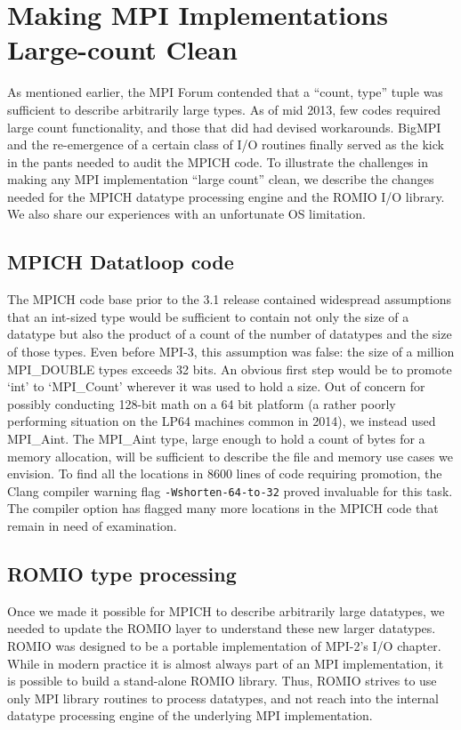 
\section{Making MPI Implementations Large-count Clean}
As mentioned earlier, the MPI Forum contended that a ``count, type''
tuple was sufficient to describe arbitrarily large types.  As of mid 2013, few codes
required large count functionality, and those that did had devised workarounds.
BigMPI and the re-emergence of a certain class of I/O routines finally served
as the kick in
the pants needed to audit the MPICH code.  To illustrate the challenges in
making any MPI implementation ``large count'' clean, we describe the changes
needed for the MPICH datatype processing engine and the ROMIO I/O library. We
also share our experiences with an unfortunate OS limitation.


\subsection{MPICH Datatloop code}
The MPICH code base prior to the
3.1 release contained widespread assumptions that an int-sized type
would be sufficient to contain not only the size of a datatype but also the product
of a count of the number of datatypes and the size of those types.
Even before MPI-3, this assumption was false: the size of a million MPI\_DOUBLE
types exceeds 32 bits.
An obvious first step would be to promote `int' to `MPI\_Count' wherever it was
used to hold a size.
Out of concern for possibly conducting 128-bit math on a 64 bit platform (a
rather poorly performing situation on the LP64 machines common in 2014),
we instead used MPI\_Aint.  The MPI\_Aint type, large enough to hold a
count of bytes for a memory allocation, will be sufficient to describe the file
and memory use cases we envision.  To find all the locations in 8600 lines of
code requiring promotion, the Clang compiler warning flag
\texttt{-Wshorten-64-to-32} proved invaluable for this task.  The compiler option has
flagged many more
locations in the MPICH code that remain in need of examination.

\subsection{ROMIO type processing}
\label{sec:romio_typeproc}

Once we made it possible for MPICH to describe arbitrarily large datatypes, we
needed to update the ROMIO layer to understand these new larger datatypes.
ROMIO \cite{thakur:mpi-io-implement} was designed to be a portable
 implementation of MPI-2's I/O
chapter.  While in modern practice it is almost always part of an MPI
implementation, it is possible to build a stand-alone ROMIO library.  Thus,
ROMIO strives to use only MPI library routines to process datatypes, and not reach into the internal datatype processing engine of the underlying MPI implementation.


